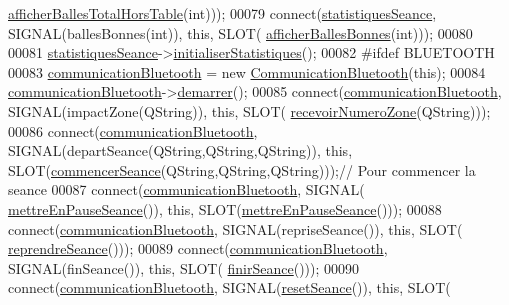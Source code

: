 \begin{DoxyCode}
      \hyperlink{class_ttpa_ihm_a6102875b095d99c147e6a71a0dfbfb28}{afficherBallesTotalHorsTable}(\textcolor{keywordtype}{int})));
00079     connect(\hyperlink{class_ttpa_ihm_abed6897d6f7b4d3a5eb8dcc07651e740}{statistiquesSeance}, SIGNAL(ballesBonnes(\textcolor{keywordtype}{int})), \textcolor{keyword}{this}, SLOT(
      \hyperlink{class_ttpa_ihm_a92494cbd992da35c40128408fb06e9a1}{afficherBallesBonnes}(\textcolor{keywordtype}{int})));
00080 
00081     \hyperlink{class_ttpa_ihm_abed6897d6f7b4d3a5eb8dcc07651e740}{statistiquesSeance}->\hyperlink{class_statistiques_seance_a17e1c49e2986a8490ff96e4bd7733291}{initialiserStatistiques}();
00082 \textcolor{preprocessor}{#ifdef BLUETOOTH}
00083     \hyperlink{class_ttpa_ihm_a477c64fe999f4dec468fca9b04c5d842}{communicationBluetooth} = \textcolor{keyword}{new} \hyperlink{class_communication_bluetooth}{CommunicationBluetooth}(\textcolor{keyword}{this});
00084     \hyperlink{class_ttpa_ihm_a477c64fe999f4dec468fca9b04c5d842}{communicationBluetooth}->\hyperlink{class_communication_bluetooth_a056f2cb0ff59757e027a430e356e22bc}{demarrer}();
00085     connect(\hyperlink{class_ttpa_ihm_a477c64fe999f4dec468fca9b04c5d842}{communicationBluetooth}, SIGNAL(impactZone(QString)), \textcolor{keyword}{this}, SLOT(
      \hyperlink{class_ttpa_ihm_a0070bf0027c8a903e5bb5a543533e82c}{recevoirNumeroZone}(QString)));
00086     connect(\hyperlink{class_ttpa_ihm_a477c64fe999f4dec468fca9b04c5d842}{communicationBluetooth}, SIGNAL(departSeance(QString,QString,QString)), \textcolor{keyword}{
      this}, SLOT(\hyperlink{class_ttpa_ihm_a9bf7a4cddbdbf786d781e4d084409068}{commencerSeance}(QString,QString,QString)));\textcolor{comment}{// Pour commencer la seance}
00087     connect(\hyperlink{class_ttpa_ihm_a477c64fe999f4dec468fca9b04c5d842}{communicationBluetooth}, SIGNAL(
      \hyperlink{class_ttpa_ihm_a4888ff555295f4e90e0d42bd87ad2d92}{mettreEnPauseSeance}()), \textcolor{keyword}{this}, SLOT(\hyperlink{class_ttpa_ihm_a4888ff555295f4e90e0d42bd87ad2d92}{mettreEnPauseSeance}()));
00088     connect(\hyperlink{class_ttpa_ihm_a477c64fe999f4dec468fca9b04c5d842}{communicationBluetooth}, SIGNAL(repriseSeance()), \textcolor{keyword}{this}, SLOT(
      \hyperlink{class_ttpa_ihm_acf4cf42c5d1481ccda7ae12bace0a6d5}{reprendreSeance}()));
00089     connect(\hyperlink{class_ttpa_ihm_a477c64fe999f4dec468fca9b04c5d842}{communicationBluetooth}, SIGNAL(finSeance()), \textcolor{keyword}{this}, SLOT(
      \hyperlink{class_ttpa_ihm_aec3a96864aaa87f245bdafbf7a076a94}{finirSeance}()));
00090     connect(\hyperlink{class_ttpa_ihm_a477c64fe999f4dec468fca9b04c5d842}{communicationBluetooth}, SIGNAL(\hyperlink{class_ttpa_ihm_a521fea1cb4384157e5422a033e9a4d4f}{resetSeance}()), \textcolor{keyword}{this}, SLOT(

\end{DoxyCode}
